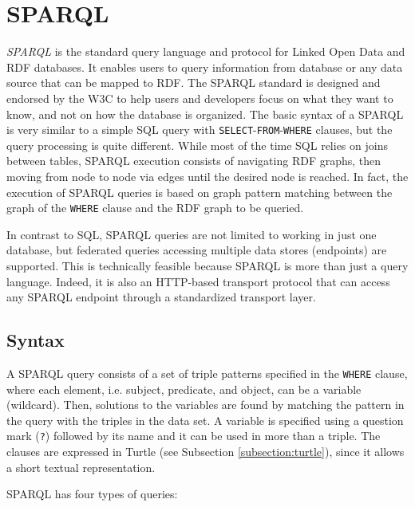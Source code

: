 \documentclass[10pt, a4paper]{report}
\begin{document}
\section{SPARQL}

\textit{SPARQL} is the standard query language and protocol for Linked Open Data and RDF databases. It enables users to query information from database or any data source that can be mapped to RDF. The SPARQL standard is designed and endorsed by the W3C to help users and developers focus on what they want to know, and not on how the database is organized.
The basic syntax of a SPARQL is very similar to a simple SQL query with \texttt{SELECT}-\texttt{FROM}-\texttt{WHERE} clauses, but the query processing is quite different. While most of the time SQL relies on joins between tables, SPARQL execution consists of navigating RDF graphs, then moving from node to node via edges until the desired node is reached. In fact, the execution of SPARQL queries is based on graph pattern matching between the graph of the \texttt{WHERE} clause and the RDF graph to be queried.

In contrast to SQL, SPARQL queries are not limited to working in just one database, but federated queries accessing multiple data stores (endpoints) are supported. This is technically feasible because SPARQL is more than just a query language. Indeed, it is also an HTTP-based transport protocol that can access any SPARQL endpoint through a standardized transport layer.

\subsection{Syntax}

A SPARQL query consists of a set of triple patterns specified in the \texttt{WHERE} clause, where each element, i.e. subject, predicate, and object, can be a variable (wildcard). Then, solutions to the variables are found by matching the pattern in the query with the triples in the data set. A variable is specified using a question mark (\texttt{?}) followed by its name and it can be used in more than a triple.
The clauses are expressed in Turtle (see Subsection \ref{subsection:turtle}), since it allows a short textual representation.

SPARQL has four types of queries: \\
\end{document}
